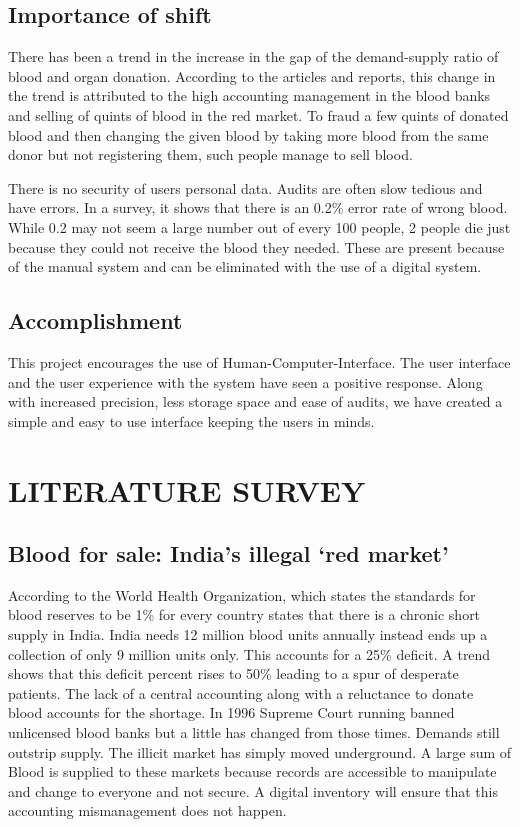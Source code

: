 \documentclass[BTech]{srmuthesis}
\begin{document}
\section{Importance of shift}
There has been a trend in the increase in the gap of the demand-supply ratio of blood and organ donation. According to the articles and reports, this change in the trend is attributed to the high accounting management in the blood banks and selling of quints of blood in the red market. To fraud a few quints of donated blood and then changing the given blood by taking more blood from the same donor but not registering them, such people manage to sell blood.\par 
There is no security of users personal data. Audits are often slow tedious and have errors. In a survey, it shows that there is an 0.2\% error rate of wrong blood. While 0.2 may not seem a large number out of every 100 people, 2 people die just because they could not receive the blood they needed. These are present because of the manual system and can be eliminated with the use of a digital system.
\section{Accomplishment}
This project encourages the use of Human-Computer-Interface. The user interface and the user experience with the system have seen a positive response. Along with increased precision, less storage space and ease of audits, we have created a simple and easy to use interface keeping the users in minds.


\chapter{LITERATURE SURVEY}
\label{chap:literature}
\section{Blood for sale: India’s illegal ‘red market’}
According to the World Health Organization, which states the standards for blood reserves to be 1\% for every country states that there is a chronic short supply in India. India needs 12 million blood units annually instead ends up a collection of only 9 million units only. This accounts for a 25\% deficit. A trend shows that this deficit percent rises to 50\% leading to a spur of desperate patients. The lack of a central accounting along with a reluctance to donate blood accounts for the shortage. In 1996 Supreme Court running banned unlicensed blood banks but a little has changed from those times. Demands still outstrip supply. The illicit market has simply moved underground. A large sum of Blood is supplied to these markets because records are accessible to manipulate and change to everyone and not secure. A digital inventory will ensure that this accounting mismanagement does not happen. \cite{bbcarticle}
\end{document}

